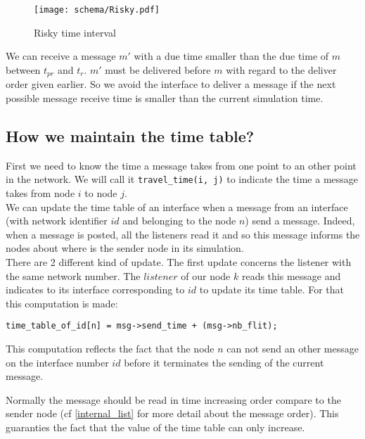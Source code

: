 \begin{figure}[h]
\begin{center}
    \texttt{[image: schema/Risky.pdf]}
	\caption{Risky time interval}
	\label{risky}
\end{center}
\end{figure}

We can receive a message $m'$ with a due time smaller than the due time of $m$
between $t_{pr}$ and $t_r$. $m'$ must be delivered before $m$ with regard to
the deliver order given earlier.
So we avoid the interface to deliver a message if the next possible message 
receive time is smaller than the current simulation time.


\subsection{How we maintain the time table?}
First we need to know the time a message takes from one point to an other point
in the network. We will call it \verb|travel_time(i, j)| to indicate the time
a message takes from node $i$ to node $j$.\\

We can update the time table of an interface when a message from an interface 
(with network identifier $id$ and belonging to the node $n$) send a message. 
Indeed, when a message is posted, all the listeners read it and so this message
informs the nodes about where is the sender node in its simulation. \\

There are 2 different kind of update.
The first update concerns the listener with the same network number.
The $listener$ of our node $k$ reads this message and indicates to its interface 
corresponding to $id$ to update its time table. For that this computation is made:
\begin{verbatim}
time_table_of_id[n] = msg->send_time + (msg->nb_flit);
\end{verbatim}
This computation reflects the fact that the node $n$ can not send an other 
message on the interface number $id$ before it terminates the sending of 
the current message.

Normally the message should be read in time increasing order compare to the sender
node (cf \ref{internal_list} for more detail about the message order). 
This guaranties the fact that the value of the time table can only increase.\\

